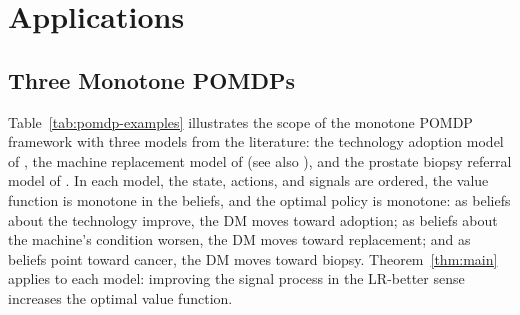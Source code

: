 \section{Applications}\label{sec:applications}

\subsection{Three Monotone POMDPs}\label{sec:three-models}

Table~\ref{tab:pomdp-examples} illustrates the scope of the monotone
POMDP framework with three models from the literature: the technology
adoption model of \citet{ulu2009uncertainty}, the machine replacement
model of \citet{white1979optimal} (see also \citealt{lovejoy1987some}),
and the prostate biopsy referral model of \citet{zhang2012optimization}.
In each model, the state, actions, and signals are ordered, the value
function is monotone in the beliefs, and the optimal policy is
monotone: as beliefs about the technology improve, the DM moves toward
adoption; as beliefs about the machine's condition worsen, the DM moves
toward replacement; and as beliefs point toward cancer, the DM moves
toward biopsy. Theorem~\ref{thm:main} applies to each model: improving
the signal process in the LR-better sense increases the optimal value
function. 


